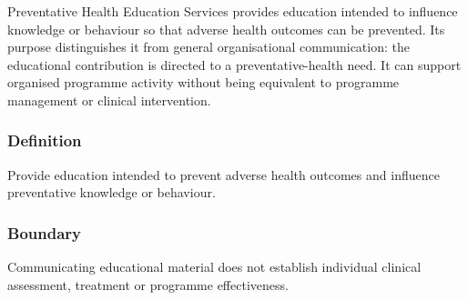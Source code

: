 Preventative Health Education Services provides education intended to influence knowledge or behaviour so that adverse health outcomes can be prevented. Its purpose distinguishes it from general organisational communication: the educational contribution is directed to a preventative-health need. It can support organised programme activity without being equivalent to programme management or clinical intervention.

\subsubsection*{Definition}

Provide education intended to prevent adverse health outcomes and influence preventative knowledge or behaviour.

\subsubsection*{Boundary}

Communicating educational material does not establish individual clinical assessment, treatment or programme effectiveness.

